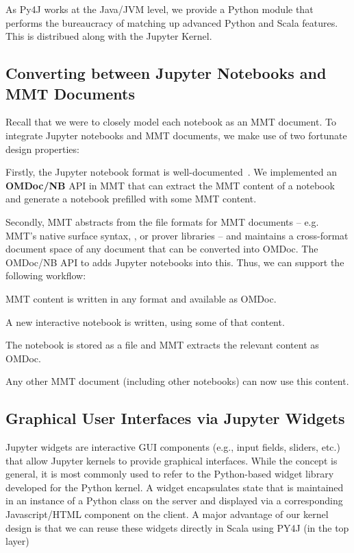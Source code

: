 As Py4J works at the Java/JVM level, we provide a Python module that performs the bureaucracy of matching up advanced Python and Scala features.
This is distribued along with the Jupyter Kernel. 

\subsection{Converting between Jupyter Notebooks and MMT Documents}\label{sec:kernel:mapping}

Recall that we were to closely model each notebook as an MMT document. 
To integrate Jupyter notebooks and MMT documents, we make use of two fortunate design properties:

Firstly, the Jupyter notebook format is well-documented~\cite{nbformat:on}. 
We implemented an \textbf{OMDoc/NB} API in MMT that can extract the MMT content of a notebook and generate a notebook prefilled with some MMT content.

Secondly, MMT abstracts from the file formats for MMT documents -- e.g. MMT's native surface syntax, \sTeX, or prover libraries -- and  maintains a cross-format document space  of any document that can be converted into OMDoc.
The OMDoc/NB API to adds Jupyter notebooks into this.
Thus, we can support the following workflow:
\begin{compactenum}
 \item MMT content is written in any format and available as OMDoc.
 \item A new interactive notebook is written, using some of that content.
 \item The notebook is stored as a file and MMT extracts the relevant content as OMDoc.
 \item Any other MMT document (including other notebooks) can now use this content.
\end{compactenum}

\subsection{Graphical User Interfaces via Jupyter Widgets}\label{sec:kernel:widgets}

Jupyter widgets are interactive GUI components (e.g., input fields, sliders, etc.) that allow Jupyter kernels to provide graphical interfaces.
While the concept is general, it is most commonly used to refer to the Python-based widget library developed for the Python kernel.
A widget encapsulates state that is maintained in an instance of a Python class on the server and displayed via a corresponding Javascript/HTML component on the client.
A major advantage of our kernel design is that we can reuse these widgets directly in Scala using PY4J (in the top layer)

